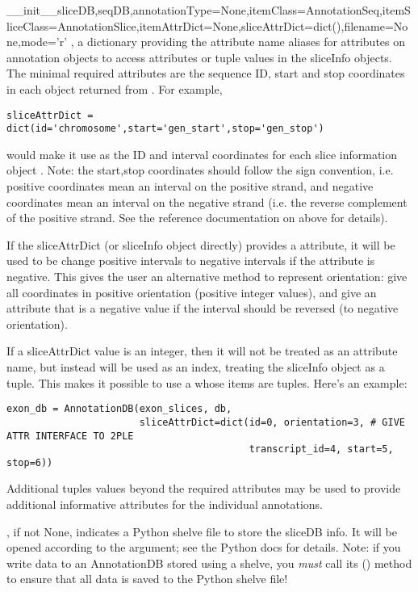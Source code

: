 \documentclass{howto}
\begin{document}
\begin{funcdesc}{__init__}{sliceDB,seqDB,annotationType=None,itemClass=AnnotationSeq,itemSliceClass=AnnotationSlice,itemAttrDict=None,sliceAttrDict=dict(),filename=None,mode='r'}
  , a dictionary providing the attribute name aliases
  for attributes on annotation objects to access attributes or tuple values
  in the sliceInfo objects.  The minimal required attributes are the
  sequence ID, start and stop coordinates in each object returned from .
  For example,
\begin{verbatim}
sliceAttrDict = dict(id='chromosome',start='gen_start',stop='gen_stop')
\end{verbatim}
  would make it use  as the ID and interval
  coordinates for each slice information object .  Note: the start,stop
  coordinates should follow the  sign convention, i.e. positive
  coordinates mean an interval on the positive strand, and negative coordinates
  mean an interval on the negative strand (i.e. the reverse complement of
  the positive strand.  See the reference documentation on  above
  for details).

  If the sliceAttrDict (or sliceInfo object directly) provides a 
  attribute, it will be used to be change positive intervals to negative intervals
  if the  attribute is negative.  This gives the user an alternative
  method to represent orientation: give all coordinates in positive orientation
  (positive integer values), and give an  attribute that
  is a negative value if the interval should be reversed (to negative orientation).

  If a sliceAttrDict value is an integer, then it will not be treated as an
  attribute name, but instead will be used as an index, treating the sliceInfo
  object as a tuple.  This makes it possible to use a  whose
  items are tuples.  Here's an example:
\begin{verbatim}
exon_db = AnnotationDB(exon_slices, db,
                       sliceAttrDict=dict(id=0, orientation=3, # GIVE ATTR INTERFACE TO 2PLE
                                          transcript_id=4, start=5, stop=6))
\end{verbatim}
  Additional tuples values beyond the required 
  attributes may be used to provide additional informative attributes
  for the individual annotations.

  , if not None, indicates a Python shelve file to store the
  sliceDB info.  It will be opened according to the  argument; 
  see the Python  docs for details.  Note: if you write data
  to an AnnotationDB stored using a shelve, you {\em must} call its
  () method to ensure that all data is saved to the Python
  shelve file!
\end{funcdesc}
\end{document}
